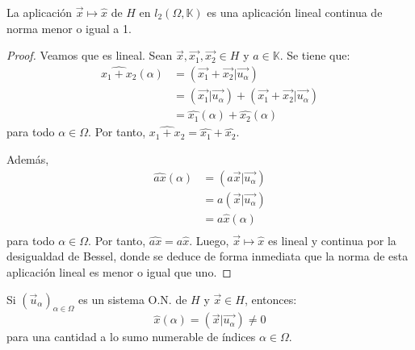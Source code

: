 \documentclass[12pt]{report}
\theoremstyle{largebreak}
\newcommand\pint[2]{\ensuremath{\left(#1\big| #2\right)}}
\begin{document}
    \begin{cor}
        La aplicación $\vec{x}\mapsto\hat{x}$ de $H$ en $l_2(\Omega,\mathbb{K})$ es una aplicación lineal continua de norma menor o igual a 1.
    \end{cor}

    \begin{proof}
        Veamos que es lineal. Sean $\vec{x},\vec{x_1},\vec{x_2}\in H$ y $a\in\mathbb{K}$. Se tiene que:
        \begin{equation*}
            \begin{split}
                \widehat{x_1+x_2}(\alpha)&=\pint{\vec{x_1}+\vec{x_2}}{\vec{u_\alpha}}\\
                &=\pint{\vec{x_1}}{\vec{u_\alpha}}+\pint{\vec{x_1}+\vec{x_2}}{\vec{u_\alpha}}\\
                &=\hat{x_1}(\alpha)+\hat{x_2}(\alpha)
            \end{split}
        \end{equation*}
        para todo $\alpha\in\Omega$. Por tanto, $\widehat{x_1+x_2}=\hat{x_1}+\hat{x_2}$.

        Además,
        \begin{equation*}
            \begin{split}
                \widehat{a x}(\alpha)&=\pint{a\vec{x}}{\vec{u_\alpha}}\\
                &=a\pint{\vec{x}}{\vec{u_\alpha}}\\
                &=a\hat{x}(\alpha) \\
            \end{split}
        \end{equation*}
        para todo $\alpha\in\Omega$. Por tanto, $\widehat{a x}=a\hat{x}$. Luego, $\vec{x}\mapsto\hat{x}$ es lineal y continua por la desigualdad de Bessel, donde se deduce de forma inmediata que la norma de esta aplicación lineal es menor o igual que uno.
    \end{proof}
        
    \begin{cor}
        Si $(\vec{u}_\alpha)_{\alpha\in\Omega}$ es un sistema O.N. de $H$ y $\vec{x}\in H$, entonces:
        \begin{equation*}
            \hat{x}(\alpha)=\pint{\vec{x}}{\vec{u_\alpha}}\neq0
        \end{equation*}
        para una cantidad a lo sumo numerable de índices $\alpha\in\Omega$.
    \end{cor}
\end{document}

